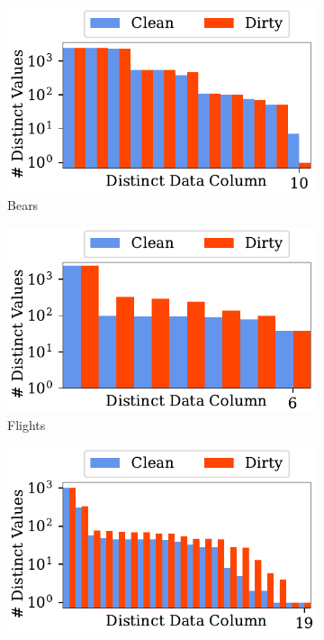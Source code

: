 \begin{figure}[!t]
    \centering 
    \centering
\begin{subfigure}{0.32\textwidth}
    \includegraphics[width=\textwidth]{figures/plot/distinct/beers_distinct/combined.pdf}
    \caption{\label{exp:d1}Bears}
    \label{exp:distincts_bears}
\end{subfigure}
\hfill
\begin{subfigure}{0.32\textwidth}
    \includegraphics[width=\textwidth]{figures/plot/distinct/flights_distinct/combined.pdf}
    \caption{Flights}
    \label{exp:distincts_flights}
\end{subfigure}
\hfill
\begin{subfigure}{0.32\textwidth}
    \includegraphics[width=\textwidth]{figures/plot/distinct/hospital_distinct/combined.pdf}

\end{subfigure}
\end{figure}
